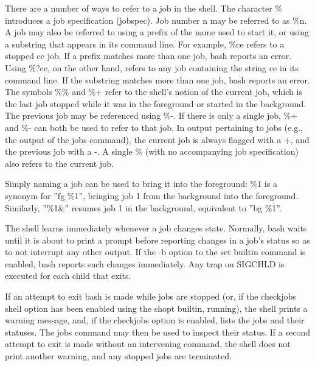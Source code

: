 There are a number of ways to refer to a job in the shell. The character \% introduces a job specification (jobspec). Job number n may be referred to as \%n. A job may also be referred to using a prefix of the name used to start it, or using a substring that appears in its command line. For example, \%ce refers to a stopped ce job. If a prefix matches more than one job, bash reports an error. Using \%?ce, on the other hand, refers to any job containing the string ce in its command line. If the substring matches more than one job, bash reports an error. The symbols \%\% and \%+ refer to the shell's notion of the current job, which is the last job stopped while it was in the foreground or started in the background. The previous job may be referenced using \%-. If there is only a single job, \%+ and \%- can both be used to refer to that job. In output pertaining to jobs (e.g., the output of the jobs command), the current job is always flagged with a +, and the previous job with a -. A single \% (with no accompanying job specification) also refers to the current job.

Simply naming a job can be used to bring it into the foreground: \%1 is a synonym for ''fg \%1'', bringing job 1 from the background into the foreground. Similarly, ''\%1\&'' resumes job 1 in the background, equivalent to ''bg \%1''.

The shell learns immediately whenever a job changes state. Normally, bash waits until it is about to print a prompt before reporting changes in a job's status so as to not interrupt any other output. If the -b option to the set builtin command is enabled, bash reports such changes immediately. Any trap on SIGCHLD is executed for each child that exits.

If an attempt to exit bash is made while jobs are stopped (or, if the checkjobs shell option has been enabled using the shopt builtin, running), the shell prints a warning message, and, if the checkjobs option is enabled, lists the jobs and their statuses. The jobs command may then be used to inspect their status. If a second attempt to exit is made without an intervening command, the shell does not print another warning, and any stopped jobs are terminated.